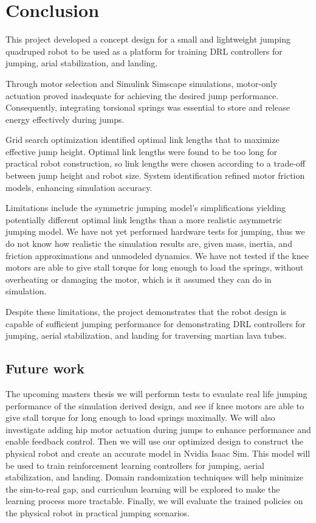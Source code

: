 \section{Conclusion}
\label{sec:conclusion}

This project developed a concept design for a small and lightweight jumping quadruped robot to be used as a platform for training DRL controllers for jumping, arial stabilization, and landing. 

Through motor selection and Simulink Simscape simulations, motor-only actuation proved inadequate for achieving the desired jump performance. Consequently, integrating torsional springs was essential to store and release energy effectively during jumps.

Grid search optimization identified optimal link lengths that to maximize effective jump height. Optimal link lengths were found to be too long for practical robot construction, so link lengths were chosen according to a trade-off between jump height and robot size. System identification refined motor friction models, enhancing simulation accuracy.

Limitations include the symmetric jumping model's simplifications yielding potentially different optimal link lengths than a more realistic asymmetric jumping model. We have not yet performed hardware tests for jumping, thus we do not know how realistic the simulation results are, given mass, inertia, and friction approximations and unmodeled dynamics. We have not tested if the knee motors are able to give stall torque for long enough to load the springs, without overheating or damaging the motor, which is it assumed they can do in simulation.

Despite these limitations, the project demonstrates that the robot design is capable of sufficient jumping performance for demonstrating DRL controllers for jumping, aerial stabilization, and landing for traversing martian lava tubes.


\subsection{Future work}
The upcoming masters thesis we will performn tests to evaulate real life jumping performance of the simulation derived design, and see if knee motors are able to give stall torque for long enough to load springs maximally. We will also investigate adding hip motor actuation during jumps to enhance performance and enable feedback control. Then we will use our optimized design to construct the physical robot and create an accurate model in Nvidia Isaac Sim. This model will be used to train reinforcement learning controllers for jumping, aerial stabilization, and landing. Domain randomization techniques will help minimize the sim-to-real gap, and curriculum learning will be explored to make the learning process more tractable. Finally, we will evaluate the trained policies on the physical robot in practical jumping scenarios.


